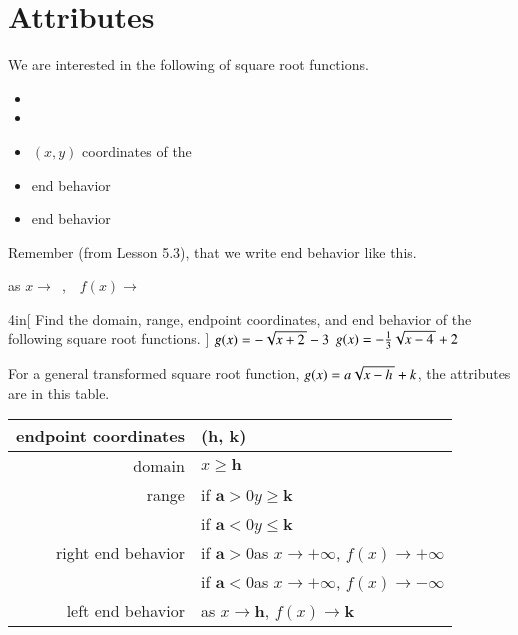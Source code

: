 \section{Attributes}

We are interested in the following  of square root functions.
\begin{itemize}[nosep]
    \item {}
    \item {}
    \item $(x,y)$ coordinates of the 
    \item {} end behavior
    \item {} end behavior
\end{itemize}

Remember (from Lesson 5.3), that we write end behavior like this.
\begin{myCenteredBox}[width=4in,]
    \Large
    \begin{center}
        as $x \longrightarrow$ \fbox{\strut\hspace{2em}}\,,
        \,\,
        $ f(x) \longrightarrow$ \fbox{\strut\hspace{2em}}
    \end{center}
\end{myCenteredBox}

\begin{my2Problems}[\normalsize]{4in}[
    Find the domain, range, endpoint coordinates, and end behavior of 
    the following square root functions.
    ]
    {
        $g(x) = - \myRoot{x+2} - 3$
    }
    {
        $g(x) = - \frac{1}{3} \myRoot{x-4} + 2$
    }
\end{my2Problems}

For a general transformed square root function,
$g(x) = a \myRoot{x-h} + k$, 
the attributes 
are in this table.

\begin{myCenteredBox}[width=6.25in,]
\Large
\begin{center}
\begin{tabular}{r||l}
    endpoint coordinates & (${\boldsymbol h}$, ${\boldsymbol k}$)  \\
    \midrule
    domain               & $x \geq {\boldsymbol h}$  \\
    \midrule
    range                & if ${\boldsymbol a>0}$\quad  $y \geq {\boldsymbol k}$ \\
                         & if ${\boldsymbol a<0}$\quad  $y \leq {\boldsymbol k}$ \\
    \midrule
    right end behavior   & if ${\boldsymbol a>0}$\quad  as $x \rightarrow +\infty$, $f(x) \rightarrow +\infty$ \\
                         & if ${\boldsymbol a<0}$\quad  as $x \rightarrow +\infty$, $f(x) \rightarrow -\infty$ \\
                         \midrule
    left end behavior    & as $x \rightarrow {\boldsymbol h}$, $f(x) \rightarrow {\boldsymbol k}$ \\
                     \end{tabular}
\end{center}
\end{myCenteredBox}